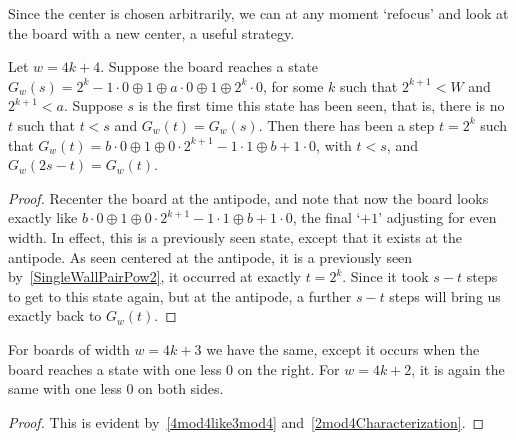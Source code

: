 \documentclass[12pt,letterpaper]{article}
\begin{document}
Since the center is chosen arbitrarily, we can at any moment `refocus' and look at the board with a new center, a useful strategy. 
\begin{prop}\label{SymmetricAntipode}
  Let $w=4k+4$. Suppose the board reaches a state $G_w(s)=2^k-1\cdot 0\oplus 1\oplus a\cdot 0\oplus 1\oplus 2^k\cdot 0$, for some $k$ such that $2^{k+1}<W$ and $2^{k+1}<a$. Suppose $s$ is the first time this state has been seen, that is, there is no $t$ such that $t<s$ and $G_w(t)=G_w(s)$. Then there has been a step $t=2^k$ such that $G_w(t)=b\cdot 0 \oplus 1\oplus 0\cdot 2^{k+1}-1\cdot 1\oplus b+1\cdot 0$, with $t<s$, and $G_w(2s-t)=G_w(t)$. 
\end{prop}
\begin{proof} Recenter the board at the antipode, and note that now the board looks exactly like $b\cdot 0 \oplus 1\oplus 0\cdot 2^{k+1}-1\cdot 1\oplus b+1\cdot 0$, the final `$+1$' adjusting for even width. In effect, this is a previously seen state, except that it exists at the antipode. As seen centered at the antipode, it is a previously seen by~\cref{SingleWallPairPow2}, it occurred at exactly $t=2^k$. Since it took $s-t$ steps to get to this state again, but at the antipode, a further $s-t$ steps will bring us exactly back to $G_w(t)$.
\end{proof}
\begin{cor}\label{SymmetricAntipodeAll}
  For boards of width $w=4k+3$ we have the same, except it occurs when the board reaches a state with one less 0 on the right. For $w=4k+2$, it is again the same with one less 0 on both sides. 
\end{cor}
\begin{proof}
  This is evident by~\cref{4mod4like3mod4} and~\cref{2mod4Characterization}. 
\end{proof}
\end{document}
